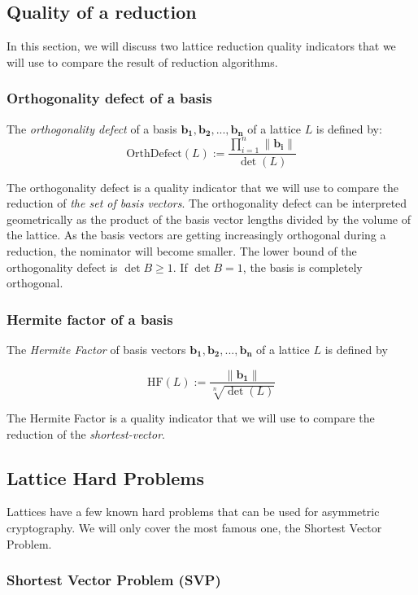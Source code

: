 \documentclass[10pt]{article}
\renewcommand{\vec}[1]{\mathbf{#1}}
\begin{document}
\subsection{Quality of a reduction}

In this section, we will discuss two lattice reduction quality indicators that we will use to compare the result of reduction algorithms.

\subsubsection{Orthogonality defect of a basis}
The \emph{orthogonality defect} of a basis $\vec{b_1},\vec{b_2},...,\vec{b_n}$ of a lattice $L$ is defined by:
\[
    \text{OrthDefect}(L) := \frac{\displaystyle\prod^{n}_{i=1} \|\vec{b_i}\| }{\det(L)}
\]

The orthogonality defect is a quality indicator that we will use to compare the reduction of \emph{the set of basis vectors}. The orthogonality defect can be interpreted geometrically as the product of the basis vector lengths divided by the volume of the lattice. As the basis vectors are getting increasingly orthogonal during a reduction, the nominator will become smaller. The lower bound of the orthogonality defect is $\det B \ge 1$. If $\det B = 1$, the basis is completely orthogonal.

\subsubsection{Hermite factor of a basis}
The \emph{Hermite Factor} of basis vectors $\vec{b_1}, \vec{b_2},...,\vec{b_n}$ of a lattice $L$ is defined by

\[
    \text{HF}(L) := \frac{\|\vec{b_1}\|}{\sqrt[n]{\det(L)}}
\]

The Hermite Factor is a quality indicator that we will use to compare the reduction of the \emph{shortest-vector}.

\subsection{Lattice Hard Problems}

Lattices have a few known hard problems that can be used for asymmetric cryptography. We will only cover the most famous one, the Shortest Vector Problem.

\subsubsection{Shortest Vector Problem (SVP)}
\end{document}
